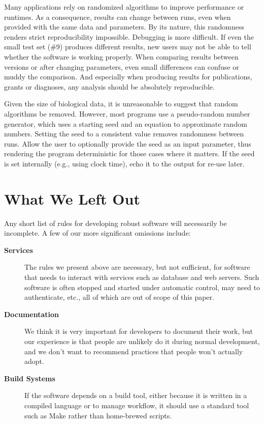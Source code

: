 \documentclass[10pt,letterpaper]{article}
\begin{document}
Many applications rely on randomized algorithms to
improve performance or runtimes. As a consequence, results can change
between runs, even when provided with the same data and parameters. By
its nature, this randomness renders strict reproducibility impossible.
Debugging is more difficult. If even the small test set (\#9) produces
different results, new users may not be able to tell whether the software is
working properly. When comparing
results between versions or after changing parameters, even small
differences can confuse or muddy the comparison. And especially when
producing results for publications, grants or diagnoses, any analysis
should be absolutely reproducible.

Given the size of biological data, it is unreasonable to suggest that
random algorithms be removed. However, most programs use a pseudo-random
number generator, which uses a starting seed and an equation to
approximate random numbers. Setting the seed to a consistent value
removes randomness between runs. Allow the user to optionally provide
the seed as an input parameter, thus rendering the program deterministic
for those cases where it matters. If the seed is set internally (e.g.,
using clock time), echo it to the output for re-use later.

\section*{What We Left Out}

Any short list of rules for developing robust software will
necessarily be incomplete.  A few of our more significant omissions
include:

\begin{description}

\item[\textbf{Services}] The rules we present above are necessary, but
  not sufficient, for software that needs to interact with services
  such as database and web servers.  Such software is often stopped
  and started under automatic control, may need to authenticate, etc.,
  all of which are out of scope of this paper.

\item[\textbf{Documentation}] We think it is very important for
  developers to document their work, but our experience is that people
  are unlikely do it during normal development, and we don't want to
  recommend practices that people won't actually adopt.

\item[\textbf{Build Systems}] If the software depends on a build tool,
  either because it is written in a compiled language or to manage
  workflow, it should use a standard tool such as Make rather than
  home-brewed scripts.

\end{description}
\end{document}
